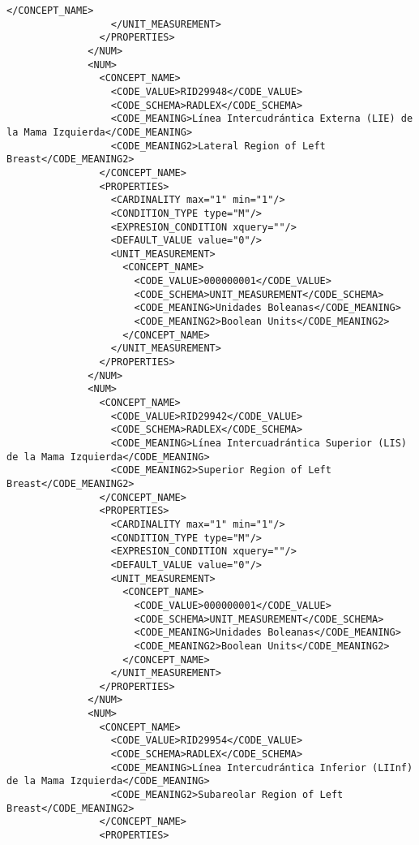 \begin{lstlisting}[label=dicom-report,caption=Informe estructurado de una exploración de mama]
                    </CONCEPT_NAME>
                  </UNIT_MEASUREMENT>
                </PROPERTIES>
              </NUM>
              <NUM>
                <CONCEPT_NAME>
                  <CODE_VALUE>RID29948</CODE_VALUE>
                  <CODE_SCHEMA>RADLEX</CODE_SCHEMA>
                  <CODE_MEANING>Línea Intercudrántica Externa (LIE) de la Mama Izquierda</CODE_MEANING>
                  <CODE_MEANING2>Lateral Region of Left Breast</CODE_MEANING2>
                </CONCEPT_NAME>
                <PROPERTIES>
                  <CARDINALITY max="1" min="1"/>
                  <CONDITION_TYPE type="M"/>
                  <EXPRESION_CONDITION xquery=""/>
                  <DEFAULT_VALUE value="0"/>
                  <UNIT_MEASUREMENT>
                    <CONCEPT_NAME>
                      <CODE_VALUE>000000001</CODE_VALUE>
                      <CODE_SCHEMA>UNIT_MEASUREMENT</CODE_SCHEMA>
                      <CODE_MEANING>Unidades Boleanas</CODE_MEANING>
                      <CODE_MEANING2>Boolean Units</CODE_MEANING2>
                    </CONCEPT_NAME>
                  </UNIT_MEASUREMENT>
                </PROPERTIES>
              </NUM>
              <NUM>
                <CONCEPT_NAME>
                  <CODE_VALUE>RID29942</CODE_VALUE>
                  <CODE_SCHEMA>RADLEX</CODE_SCHEMA>
                  <CODE_MEANING>Línea Intercuadrántica Superior (LIS) de la Mama Izquierda</CODE_MEANING>
                  <CODE_MEANING2>Superior Region of Left Breast</CODE_MEANING2>
                </CONCEPT_NAME>
                <PROPERTIES>
                  <CARDINALITY max="1" min="1"/>
                  <CONDITION_TYPE type="M"/>
                  <EXPRESION_CONDITION xquery=""/>
                  <DEFAULT_VALUE value="0"/>
                  <UNIT_MEASUREMENT>
                    <CONCEPT_NAME>
                      <CODE_VALUE>000000001</CODE_VALUE>
                      <CODE_SCHEMA>UNIT_MEASUREMENT</CODE_SCHEMA>
                      <CODE_MEANING>Unidades Boleanas</CODE_MEANING>
                      <CODE_MEANING2>Boolean Units</CODE_MEANING2>
                    </CONCEPT_NAME>
                  </UNIT_MEASUREMENT>
                </PROPERTIES>
              </NUM>
              <NUM>
                <CONCEPT_NAME>
                  <CODE_VALUE>RID29954</CODE_VALUE>
                  <CODE_SCHEMA>RADLEX</CODE_SCHEMA>
                  <CODE_MEANING>Línea Intercudrántica Inferior (LIInf) de la Mama Izquierda</CODE_MEANING>
                  <CODE_MEANING2>Subareolar Region of Left Breast</CODE_MEANING2>
                </CONCEPT_NAME>
                <PROPERTIES>

\end{lstlisting}
